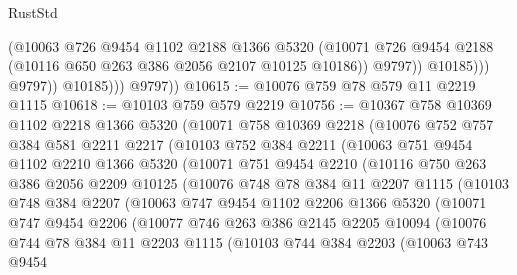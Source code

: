 \begin{lexlean}{RustStd}
\begin{coremodule}
                          (@10063
                            @726
                            @9454
                            @1102
                            @2188
                            @1366
                            @5320
                            (@10071
                              @726
                              @9454
                              @2188
                              (@10116 @650 @263 @386 @2056 @2107 @10125 @10186))
                            @9797))
                        @10185)))
                  @9797))
              @10185)))
        @9797))
@10615 := @10076 @759 @78 @579 @11 @2219 @1115
@10618 := @10103 @759 @579 @2219
@10756 := @10367
    @758
    @10369
    @1102
    @2218
    @1366
    @5320
    (@10071
      @758
      @10369
      @2218
      (@10076
        @752
        @757
        @384
        @581
        @2211
        @2217
        (@10103
          @752
          @384
          @2211
          (@10063
            @751
            @9454
            @1102
            @2210
            @1366
            @5320
            (@10071
              @751
              @9454
              @2210
              (@10116
                @750
                @263
                @386
                @2056
                @2209
                @10125
                (@10076
                  @748
                  @78
                  @384
                  @11
                  @2207
                  @1115
                  (@10103
                    @748
                    @384
                    @2207
                    (@10063
                      @747
                      @9454
                      @1102
                      @2206
                      @1366
                      @5320
                      (@10071
                        @747
                        @9454
                        @2206
                        (@10077
                          @746
                          @263
                          @386
                          @2145
                          @2205
                          @10094
                          (@10076
                            @744
                            @78
                            @384
                            @11
                            @2203
                            @1115
                            (@10103
                              @744
                              @384
                              @2203
                              (@10063
                                @743
                                @9454

\end{coremodule}
\end{lexlean}
